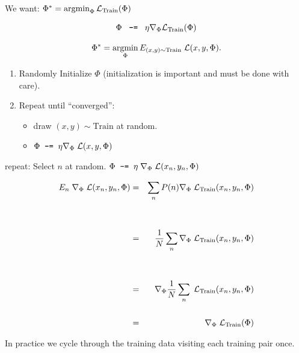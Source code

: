 {\vfill
\centerline{We want: \hspace{3ex} $\Phi^*  =  \operatorname*{argmin}_\Phi {\cal L}_{\mathrm{Train}}(\Phi)$}

\vfill
$$\Phi \;\;\;\mbox{\tt -=}\;\;\; \eta \nabla_\Phi {\cal L}_\mathrm{Train}(\Phi)$$

$$\Phi^* = \operatorname*{argmin}_\Phi E_{(x,y) \sim \mathrm{Train}} \; {\cal L}(x,y,\Phi).$$

\vfill
\begin{enumerate}
\item Randomly Initialize $\Phi$ (initialization is important and must be done with care).

  \vfill
  \item Repeat until ``converged'':

    \vfill
    \begin{itemize}
    \item draw $(x,y) \sim \mathrm{Train}$ at random.
      \vfill
    \item $\Phi \;\;\mbox{\tt -=}\;\; \eta \nabla_\Phi\;{\cal L}(x,y,\Phi)$
    \end{itemize}
\end{enumerate}


\vfill
\vfill
repeat:  Select $n$ at random. $\Phi \;\;\mbox{\tt -=}\;\; \eta \;\nabla_\Phi \; {\cal L}(x_n,y_n,\Phi)$

\begin{eqnarray*}
  E_{n}\;\nabla_\Phi \; {\cal L}(x_n,y_n,\Phi) & = & \sum_n P(n) \nabla_\Phi\;{\cal L}_{\mathrm{Train}}(x_n,y_n,\Phi) \\
  \\
  \\ & = & \frac{1}{N} \sum_n \nabla_\Phi\;{\cal L}_{\mathrm{Train}}(x_n,y_n,\Phi) \\
  \\
    \\ & = & \nabla_\Phi \frac{1}{N} \sum_n \;{\cal L}_{\mathrm{Train}}(x_n,y_n,\Phi) \\
  \\
  &  = & \nabla_\Phi\;{\cal L}_{\mathrm{Train}}(\Phi)
\end{eqnarray*}




In practice we cycle through the training data visiting each training pair once.

}

